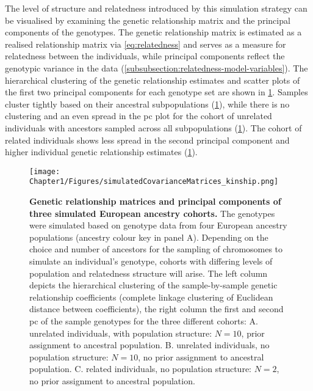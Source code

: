 The level of structure and relatedness introduced by this simulation strategy can be visualised by examining the genetic relationship matrix and the principal components of the genotypes. The genetic relationship matrix is estimated as a realised relationship matrix via \cref{eq:relatedness} and serves as a measure for relatedness between the individuals, while principal components reflect the genotypic variance in the data (\cref{subsubsection:relatedness-model-variables}). The hierarchical clustering of the genetic relationship estimates and scatter plots of the first two principal components for each genotype set are shown in \cref{fig:kinship-matrices}. Samples cluster tightly based on their ancestral subpopulations (\cref{fig:kinship-matrices}), while there is no clustering and an even spread in the \gls{pc} plot for the cohort of unrelated individuals with ancestors sampled across all subpopulations (\cref{fig:kinship-matrices}). The cohort of related individuals shows less spread in the second principal component and higher individual genetic relationship estimates (\cref{fig:kinship-matrices}).


\begin{figure}[htbp]
	\centering
	\texttt{[image: Chapter1/Figures/simulatedCovarianceMatrices\_kinship.png]}
	\caption[\textbf{Genetic relationship matrices and principal components of three simulated European ancestry cohorts.}]{\textbf{Genetic relationship matrices and principal components of three simulated European ancestry cohorts.} The genotypes were simulated based on genotype data from four European ancestry populations (ancestry colour key in panel A). Depending on the choice and number of ancestors for the sampling of chromosomes to simulate an individual's genotype, cohorts with differing levels of population and relatedness structure will arise. The left column depicts the hierarchical clustering of the sample-by-sample  genetic relationship coefficients (complete linkage clustering of Euclidean distance between coefficients), the right column the first and second \gls{pc} of the sample genotypes for the three different cohorts: A. unrelated individuals, with population structure: \(N=10\), prior assignment to ancestral population. B. unrelated individuals, no population structure: \(N=10\), no prior assignment to ancestral population. C. related individuals, no population structure: \(N=2\), no prior assignment to ancestral population.}
 	\label{fig:kinship-matrices}
\end{figure}


